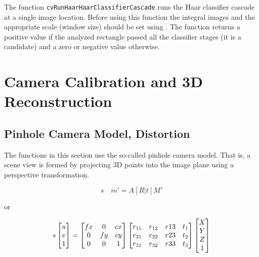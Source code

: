 
\begin{description}
\end{description}

The function \texttt{cvRunHaarHaarClassifierCascade} runs the Haar classifier
cascade at a single image location. Before using this function the
integral images and the appropriate scale (window size) should be set
using . The function returns
a positive value if the analyzed rectangle passed all the classifier stages
(it is a candidate) and a zero or negative value otherwise.

\fi

\section{Camera Calibration and 3D Reconstruction}

\subsection{Pinhole Camera Model, Distortion}

The functions in this section use the so-called pinhole camera model. That
is, a scene view is formed by projecting 3D points into the image plane
using a perspective transformation.

\[
s \quad m' = A [R|t] M'
\]

or

\[
s \begin{bmatrix} u\\ v\\ 1 \end{bmatrix} = \begin{bmatrix} fx & 0 & cx\\ 0 & fy & cy\\ 0 & 0 & 1 \end{bmatrix}
\begin{bmatrix}
 r_{11} & r_{12} & r{13} & t_1 \\
 r_{21} & r_{22} & r{23} & t_2 \\
 r_{31} & r_{32} & r{33} & t_3
\end{bmatrix}
\begin{bmatrix}X\\Y\\Z\\1 \end{bmatrix}
\]

